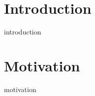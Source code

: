 \documentclass[11pt, a4paper]{article} %
\theoremstyle{definition}
\begin{document}
%



\setcounter{page}{1} %

\section{Introduction}
{introduction}


\section{Motivation}
{motivation}
\end{document}
